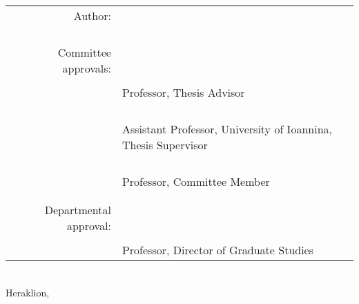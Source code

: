 \begin{titlepage}
\begin{center}
\begin{tabular}{rl}
\\
Author: & \underline{\phantom{123456789012345678901234567890123456789012}}\\
    & \owner{}\\
    \\
    \\
    \\
Committee approvals: & \underline{\phantom{123456789012345678901234567890123456789012}}\\
    & \firstprof{}\\
    & {\small Professor, Thesis Advisor}\\
    \vspace{0.2cm}
    \\
    \\
& \underline{\phantom{123456789012345678901234567890123456789012}}\\
    & \secondprof{}\\
    & {\small Assistant Professor, University of Ioannina, Thesis Supervisor}\\
    \vspace{0.2cm}
    \\
    \\
& \underline{\phantom{123456789012345678901234567890123456789012}}\\
    & \thirdprof{}\\
    & {\small  Professor, Committee Member}\\
    \vspace{0.2cm}
    \\
    \\
\hspace{1.4ex}Departmental approval: & \underline{\phantom{123456789012345678901234567890123456789012}}\\
    & \chair{}\\
    & {\small  Professor, Director of Graduate Studies}\\
\end{tabular}
\\

\vfill
Heraklion, \thesisdate{}
\end{center}

\thispagestyle{empty}

\end{titlepage}
